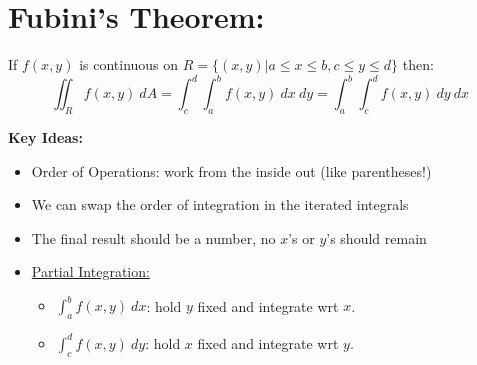 
\vspace*{.2in}

\section*{Fubini's Theorem:}
If \(f(x,y)\) is continuous on \(R=\{ (x,y) | a\leq x \leq b, c\leq y \leq d\}\) then:
\[
\iint_R f(x,y)\ dA = \int_c^d \int_a^b f(x,y)\ dx\ dy =  \int_a^b\int_c^d f(x,y)\ dy\ dx
\]

\textbf{Key Ideas:}
\begin{itemize}
\item Order of Operations: work from the inside out (like parentheses!)
\item We can swap the order of integration in the iterated integrals
\item The final result should be a number, no \(x\)'s or \(y\)'s should remain
\item \underline{Partial Integration:}
\begin{itemize}
\item \(\int_a^b f(x,y)\ dx\): hold \(y\) fixed and integrate wrt \(x\).
\item \(\int_c^d f(x,y)\ dy\): hold \(x\) fixed and integrate wrt \(y\).
\end{itemize}
\end{itemize}



